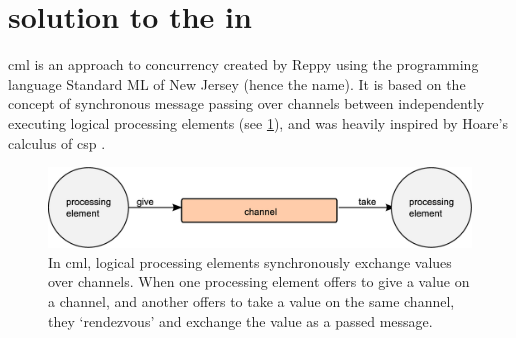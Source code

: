 \section{\label{sec:gcol:cml} solution to the  in }
\Gls{cml} is an approach to concurrency created by Reppy \cite{Reppy1991} using the programming language Standard ML of New Jersey (hence the name).  It is based on the concept of synchronous message passing over channels between independently executing logical processing elements \cite{Panangaden1997} (see \cref{fig:gcol:cml_exchange}), and was heavily inspired by Hoare's calculus of \gls{csp} \cite{Hoare1985}.  

\begin{figure}
    \centering
    \includegraphics[width=\textwidth]{chapters/gcol/figs/cml_exchange.eps}
    \caption[Diagram of the message-passing primitive in ]{In \gls{cml}, logical processing elements synchronously exchange values over channels.  When one processing element offers to give a value on a channel, and another offers to take a value on the same channel, they ‘rendezvous’ and exchange the value as a passed message.}
    \label{fig:gcol:cml_exchange}
\end{figure}


